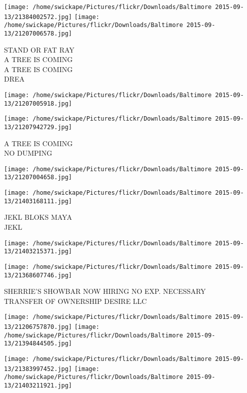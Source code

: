 \documentclass[10pt,letterpaper]{article}
\begin{document}
\texttt{[image: /home/swickape/Pictures/flickr/Downloads/Baltimore 2015-09-13/21384002572.jpg]}
\texttt{[image: /home/swickape/Pictures/flickr/Downloads/Baltimore 2015-09-13/21207006578.jpg]}

STAND OR FAT RAY\\
A TREE IS COMING\\
A TREE IS COMING\\
DREA\\
\pagebreak

\texttt{[image: /home/swickape/Pictures/flickr/Downloads/Baltimore 2015-09-13/21207005918.jpg]}

\vspace{0.25in}
\texttt{[image: /home/swickape/Pictures/flickr/Downloads/Baltimore 2015-09-13/21207942729.jpg]}

A TREE IS COMING\\
NO DUMPING\\
\pagebreak

\texttt{[image: /home/swickape/Pictures/flickr/Downloads/Baltimore 2015-09-13/21207004658.jpg]}

\vspace{0.25in}
\texttt{[image: /home/swickape/Pictures/flickr/Downloads/Baltimore 2015-09-13/21403168111.jpg]}

JEKL BLOKS MAYA\\
JEKL\\
\pagebreak

\texttt{[image: /home/swickape/Pictures/flickr/Downloads/Baltimore 2015-09-13/21403215371.jpg]}

\vspace{0.25in}
\texttt{[image: /home/swickape/Pictures/flickr/Downloads/Baltimore 2015-09-13/21368607746.jpg]}

SHERRIE'S SHOWBAR NOW HIRING NO EXP. NECESSARY\\
TRANSFER OF OWNERSHIP DESIRE LLC\\
\pagebreak

\texttt{[image: /home/swickape/Pictures/flickr/Downloads/Baltimore 2015-09-13/21206757870.jpg]}
\texttt{[image: /home/swickape/Pictures/flickr/Downloads/Baltimore 2015-09-13/21394844505.jpg]}

\texttt{[image: /home/swickape/Pictures/flickr/Downloads/Baltimore 2015-09-13/21383997452.jpg]}
\texttt{[image: /home/swickape/Pictures/flickr/Downloads/Baltimore 2015-09-13/21403211921.jpg]}
\end{document}
